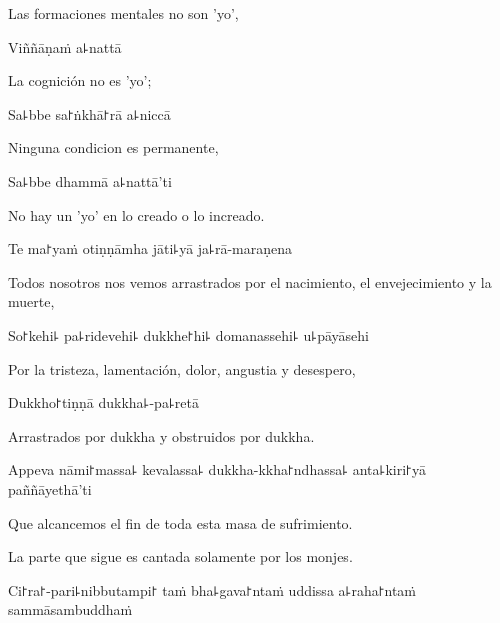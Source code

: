 \begin{english}
  Las formaciones mentales no son 'yo',
\end{english}

Viññāṇaṁ a꜕nattā

\begin{english}
  La cognición no es 'yo';
\end{english}

Sa꜕bbe sa꜓ṅkhā꜓rā a꜕niccā

\begin{english}
  Ninguna condicion es permanente,
\end{english}

Sa꜕bbe dhammā a꜕nattā'ti

\begin{english}
  No hay un 'yo' en lo creado o lo increado.
\end{english}

\clearpage

Te ma꜓yaṁ otiṇṇāmha jāti꜕yā ja꜕rā-maraṇena

\begin{english}
  Todos nosotros nos vemos arrastrados por el nacimiento, el envejecimiento y la muerte,
\end{english}

So꜓kehi꜕ pa꜕ridevehi꜕ dukkhe꜓hi꜕ domanassehi꜕ u꜕pāyāsehi

\begin{english}
  Por la tristeza, lamentación, dolor, angustia y desespero,
\end{english}

Dukkho꜓tiṇṇā dukkha꜕-pa꜕retā

\begin{english}
  Arrastrados por dukkha y obstruidos por dukkha.
\end{english}

Appeva nāmi꜓massa꜕ kevalassa꜕ dukkha-kkha꜓ndhassa꜕ anta꜕kiri꜓yā \\paññāyethā'ti

\begin{english}
  Que alcancemos el fin de toda esta masa de sufrimiento.
\end{english}

\begin{instruction}
  La parte que sigue es cantada solamente por los monjes.
\end{instruction}

Ci꜓ra꜓-pari꜕nibbutampi꜓ taṁ bha꜕gava꜓ntaṁ uddissa a꜕raha꜓ntaṁ sammāsambuddhaṁ


